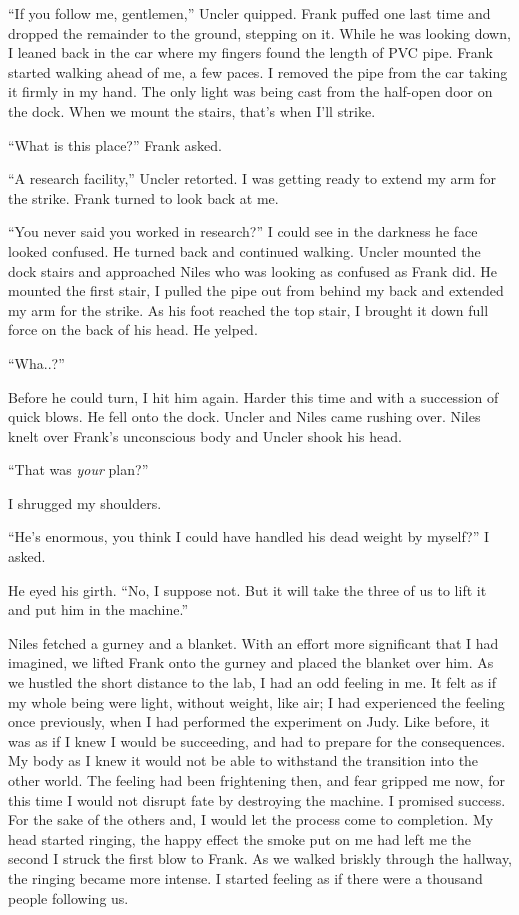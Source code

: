 ``If you follow me, gentlemen,'' Uncler quipped. Frank puffed one last
time and dropped the remainder to the ground, stepping on it. While he
was looking down, I leaned back in the car where my fingers found the
length of PVC pipe. Frank started walking ahead of me, a few paces. I
removed the pipe from the car taking it firmly in my hand. The only
light was being cast from the half-open door on the dock. When we mount
the stairs, that's when I'll strike.

``What is this place?'' Frank asked.

``A research facility,'' Uncler retorted. I was getting ready to extend
my arm for the strike. Frank turned to look back at me.

``You never said you worked in research?'' I could see in the darkness
he face looked confused. He turned back and continued walking. Uncler
mounted the dock stairs and approached Niles who was looking as confused
as Frank did. He mounted the first stair, I pulled the pipe out from
behind my back and extended my arm for the strike. As his foot reached
the top stair, I brought it down full force on the back of his head. He
yelped.

``Wha..?''

Before he could turn, I hit him again. Harder this time and with a
succession of quick blows. He fell onto the dock. Uncler and Niles came
rushing over. Niles knelt over Frank's unconscious body and Uncler shook
his head.

``That was \emph{your} plan?''

I shrugged my shoulders.

``He's enormous, you think I could have handled his dead weight by
myself?'' I asked.

He eyed his girth. ``No, I suppose not. But it will take the three of us
to lift it and put him in the machine.''

Niles fetched a gurney and a blanket. With an effort more significant
that I had imagined, we lifted Frank onto the gurney and placed the
blanket over him. As we hustled the short distance to the lab, I had an
odd feeling in me. It felt as if my whole being were light, without
weight, like air; I had experienced the feeling once previously, when I
had performed the experiment on Judy. Like before, it was as if I knew I
would be succeeding, and had to prepare for the consequences. My body as
I knew it would not be able to withstand the transition into the other
world. The feeling had been frightening then, and fear gripped me now,
for this time I would not disrupt fate by destroying the machine. I
promised success. For the sake of the others and, I would let the
process come to completion. My head started ringing, the happy effect
the smoke put on me had left me the second I struck the first blow to
Frank. As we walked briskly through the hallway, the ringing became more
intense. I started feeling as if there were a thousand people following
us.

